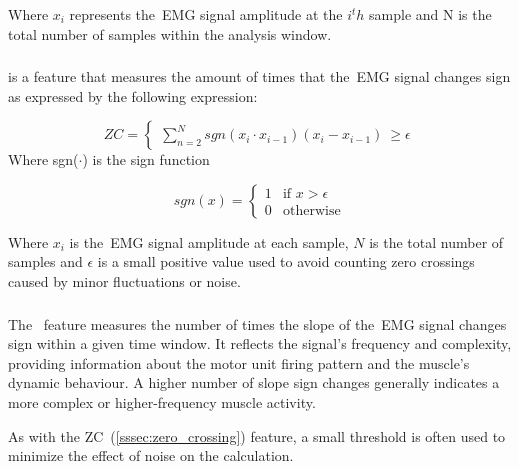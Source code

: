 Where $x_i$ represents the~\gls{EMG} signal amplitude at the $i^th$ sample and N is the total number of samples within the analysis window\cite{ComprehensiveStudyOnEMG, 
BiomedicalSignalProcessingAndControl, Review_IRBM_EMG}.

\subsubsection{} 
\label{sssec:zero_crossing}

 is a feature that measures the amount of times that the~\gls{EMG} signal changes sign as expressed by the following expression:

\begin{equation}
  ZC = \begin{cases}
    \sum_{n = 2}^{N} sgn(x_i \cdot x_{i-1})
    (x_i - x_{i-1})~\geq \epsilon 
  \end{cases}
  \label{eq:zcEQ}
\end{equation}
  Where sgn($\cdot$) is the sign function

\begin{equation}
  sgn(x) = \begin{cases}
    1 & \text{if }  x > \epsilon \\
    0 & \text{otherwise}
  \end{cases}
  \label{eq:zcEQ2}
\end{equation}

Where $x_i$ is the~\gls{EMG} signal amplitude at each sample, $N$ is the total number of samples and $\epsilon$ is a small positive value used to avoid counting zero crossings 
caused by minor fluctuations or noise\cite{Review_IRBM_EMG}.

\subsubsection{}
\label{sssec:slope_sign_changes}

The~ feature measures the number of times the slope of the~\gls{EMG} signal changes sign within a given time window. It reflects the signal's frequency and 
complexity, providing information about the motor unit firing pattern and the muscle's dynamic behaviour. A higher number of slope sign changes generally indicates a more complex or higher-frequency muscle activity.

As with the ZC~(\autoref{sssec:zero_crossing}) feature, a small threshold is often used to minimize the effect of noise on the calculation. 

